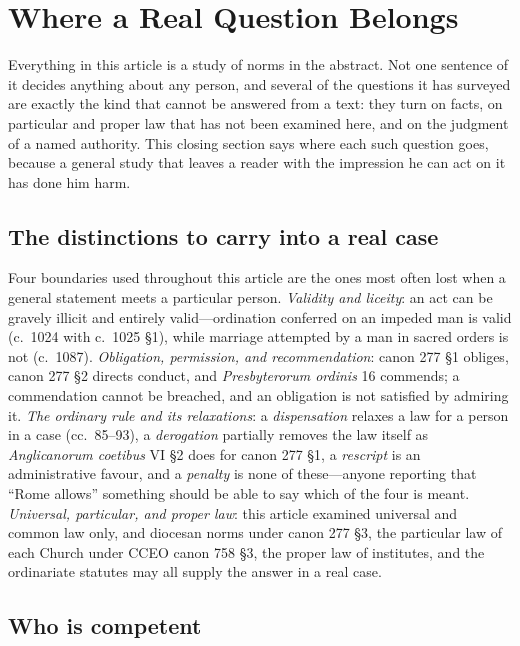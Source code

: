 \section{Where a Real Question Belongs}

Everything in this article is a study of norms in the abstract. Not one sentence of it decides anything about any person, and several of the questions it has surveyed are exactly the kind that cannot be answered from a text: they turn on facts, on particular and proper law that has not been examined here, and on the judgment of a named authority. This closing section says where each such question goes, because a general study that leaves a reader with the impression he can act on it has done him harm.

\subsection{The distinctions to carry into a real case}

Four boundaries used throughout this article are the ones most often lost when a general statement meets a particular person. \emph{Validity and liceity}: an act can be gravely illicit and entirely valid---ordination conferred on an impeded man is valid (c.~1024 with c.~1025 §1), while marriage attempted by a man in sacred orders is not (c.~1087). \emph{Obligation, permission, and recommendation}: canon 277 §1 obliges, canon 277 §2 directs conduct, and \emph{Presbyterorum ordinis} 16 commends; a commendation cannot be breached, and an obligation is not satisfied by admiring it. \emph{The ordinary rule and its relaxations}: a \emph{dispensation} relaxes a law for a person in a case (cc.~85--93), a \emph{derogation} partially removes the law itself as \emph{Anglicanorum coetibus} VI §2 does for canon 277 §1, a \emph{rescript} is an administrative favour, and a \emph{penalty} is none of these---anyone reporting that ``Rome allows'' something should be able to say which of the four is meant. \emph{Universal, particular, and proper law}: this article examined universal and common law only, and diocesan norms under canon 277 §3, the particular law of each Church  under CCEO canon 758 §3, the proper law of institutes, and the ordinariate statutes may all supply the answer in a real case.

\subsection{Who is competent}

